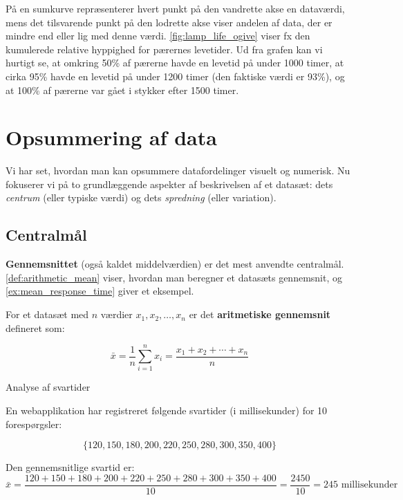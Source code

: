 På en sumkurve repræsenterer hvert punkt på den vandrette akse en dataværdi, mens det tilsvarende punkt på den lodrette akse viser andelen af data, der er mindre end eller lig med denne værdi. \autoref{fig:lamp_life_ogive} viser fx den kumulerede relative hyppighed for pærernes levetider. Ud fra grafen kan vi hurtigt se, at omkring 50\% af pærerne havde en levetid på under 1000 timer, at cirka 95\% havde en levetid på under 1200 timer (den faktiske værdi er 93\%), og at 100\% af pærerne var gået i stykker efter 1500 timer.

\section{Opsummering af data}
Vi har set, hvordan man kan opsummere datafordelinger visuelt og numerisk. Nu fokuserer vi på to grundlæggende aspekter af beskrivelsen af et datasæt: dets \emph{centrum} (eller typiske værdi) og dets \emph{spredning} (eller variation).

\subsection*{Centralmål}
\textbf{Gennemsnittet} (også kaldet middelværdien) er det mest anvendte centralmål. \autoref{def:arithmetic_mean} viser, hvordan man beregner et datasæts gennemsnit, og \autoref{ex:mean_response_time} giver et eksempel.

\begin{definition} \label{def:arithmetic_mean}

For et datasæt med $n$ værdier $x_1, x_2, \ldots, x_n$ er det \textbf{aritmetiske gennemsnit} defineret som:

$$
\bar{x} = \frac{1}{n}\sum_{i=1}^{n} x_i = \frac{x_1 + x_2 + \cdots + x_n}{n}
$$

\end{definition}


\begin{example} Analyse af svartider \label{ex:mean_response_time}

En webapplikation har registreret følgende svartider (i millisekunder) for 10 forespørgsler:

\[
\{120, 150, 180, 200, 220, 250, 280, 300, 350, 400\}
\]

Den gennemsnitlige svartid er:
\[
\bar{x} = \frac{120 + 150 + 180 + 200 + 220 + 250 + 280 + 300 + 350 + 400}{10} = \frac{2450}{10} = 245 \text{ millisekunder}
\]
\end{example}

